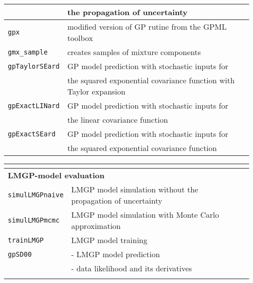 \documentclass[12pt,twoside]{article}
\newcommand{\fun}[1]{{\tt {#1}}}
\def\tabelarule{\rule[-3mm]{0mm}{10mm}}
\begin{document}
{\begin{tabular}{|l|l|}
 &the propagation of uncertainty\\
 \hline \fun{gpx} & modified version of GP rutine from the GPML toolbox \\
 \hline \fun{gmx\_sample} & creates samples of mixture components \\
 \hline \fun{gpTaylorSEard} & GP model prediction with stochastic inputs for\\ &the squared exponential covariance function with Taylor expansion\\
 \hline \fun{gpExactLINard} & GP model prediction with stochastic inputs for\\ &the linear covariance function \\
 \hline \fun{gpExactSEard} & GP model prediction with stochastic inputs for\\ &the squared exponential covariance function \\

 \hline
%
\end{tabular}
\vspace{3mm}


\begin{tabular}{|l|l|c|}
%


\multicolumn{2}{l}{\tabelarule \bf } \\ \hline
%
 \multicolumn{2}{|l|}{\tabelarule \bf LMGP-model evaluation} \\
  \hline \fun{simulLMGPnaive} & LMGP model simulation without the propagation of uncertainty \\
 \hline \fun{simulLMGPmcmc} & LMGP model simulation with Monte Carlo approximation\\
  \hline \fun{trainLMGP} & LMGP model training \\
  \hline \fun{gpSD00} & - LMGP model prediction \\
  & - data likelihood and its derivatives \\
\hline
%

\multicolumn{2}{l}{\tabelarule \bf } \\



\end{tabular}}
\end{document}
